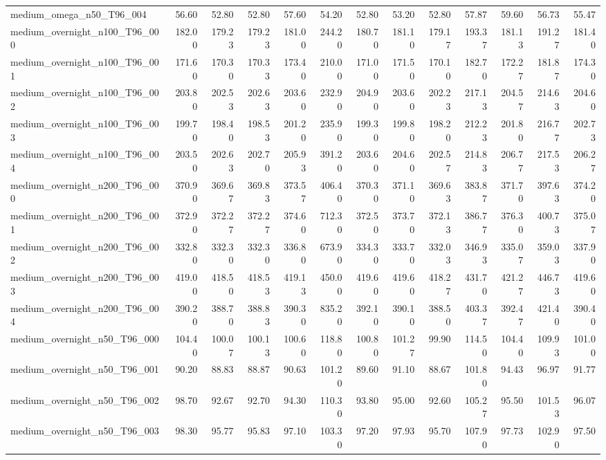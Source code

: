 \begin{table}[htbp]
\begin{tabular}{lrrrrrrrrrrrr}
medium\_omega\_n50\_T96\_004 & 56.60 & 52.80 & 52.80 & 57.60 & 54.20 & 52.80 & 53.20 & 52.80 & 57.87 & 59.60 & 56.73 & 55.47 \\
medium\_overnight\_n100\_T96\_000 & 182.00 & 179.23 & 179.23 & 181.00 & 244.20 & 180.70 & 181.10 & 179.17 & 193.37 & 181.13 & 191.27 & 181.40 \\
medium\_overnight\_n100\_T96\_001 & 171.60 & 170.30 & 170.33 & 173.40 & 210.00 & 171.00 & 171.50 & 170.10 & 182.70 & 172.27 & 181.87 & 174.30 \\
medium\_overnight\_n100\_T96\_002 & 203.80 & 202.53 & 202.63 & 203.60 & 232.90 & 204.90 & 203.60 & 202.23 & 217.13 & 204.57 & 214.63 & 204.60 \\
medium\_overnight\_n100\_T96\_003 & 199.70 & 198.40 & 198.53 & 201.20 & 235.90 & 199.30 & 199.80 & 198.20 & 212.23 & 201.80 & 216.77 & 202.73 \\
medium\_overnight\_n100\_T96\_004 & 203.50 & 202.63 & 202.70 & 205.93 & 391.20 & 203.60 & 204.60 & 202.57 & 214.83 & 206.77 & 217.53 & 206.27 \\
medium\_overnight\_n200\_T96\_000 & 370.90 & 369.67 & 369.83 & 373.57 & 406.40 & 370.30 & 371.10 & 369.63 & 383.87 & 371.70 & 397.63 & 374.20 \\
medium\_overnight\_n200\_T96\_001 & 372.90 & 372.27 & 372.27 & 374.60 & 712.30 & 372.50 & 373.70 & 372.13 & 386.77 & 376.30 & 400.73 & 375.07 \\
medium\_overnight\_n200\_T96\_002 & 332.80 & 332.30 & 332.30 & 336.80 & 673.90 & 334.30 & 333.70 & 332.03 & 346.93 & 335.07 & 359.03 & 337.90 \\
medium\_overnight\_n200\_T96\_003 & 419.00 & 418.50 & 418.53 & 419.13 & 450.00 & 419.60 & 419.60 & 418.27 & 431.70 & 421.27 & 446.73 & 419.60 \\
medium\_overnight\_n200\_T96\_004 & 390.20 & 388.70 & 388.83 & 390.30 & 835.20 & 392.10 & 390.10 & 388.50 & 403.37 & 392.47 & 421.40 & 390.40 \\
medium\_overnight\_n50\_T96\_000 & 104.40 & 100.07 & 100.13 & 100.60 & 118.80 & 100.80 & 101.27 & 99.90 & 114.50 & 104.40 & 109.93 & 101.00 \\
medium\_overnight\_n50\_T96\_001 & 90.20 & 88.83 & 88.87 & 90.63 & 101.20 & 89.60 & 91.10 & 88.67 & 101.80 & 94.43 & 96.97 & 91.77 \\
medium\_overnight\_n50\_T96\_002 & 98.70 & 92.67 & 92.70 & 94.30 & 110.30 & 93.80 & 95.00 & 92.60 & 105.27 & 95.50 & 101.53 & 96.07 \\
medium\_overnight\_n50\_T96\_003 & 98.30 & 95.77 & 95.83 & 97.10 & 103.30 & 97.20 & 97.93 & 95.70 & 107.90 & 97.73 & 102.90 & 97.50 \\

\end{tabular}
\end{table}
